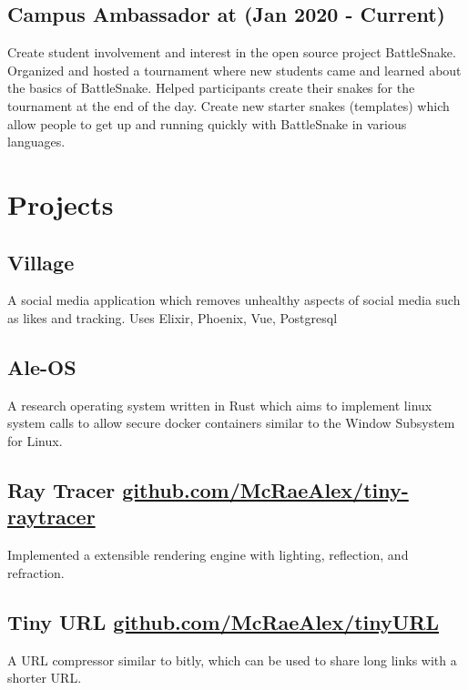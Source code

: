 \documentclass{article}
\newcommand{\hrefColored}[3]{\href{#2}{\color{#1}{#3}}}
\begin{document}
\subsection{Campus Ambassador at \hrefColored{blue}{https://github.com/McRaeAlex/AdventOfCode2018}{BattleSnake} (Jan 2020 - Current)}

Create student involvement and interest in the open source project BattleSnake.
Organized and hosted a tournament where new students came and learned about the 
basics of BattleSnake. Helped participants create their snakes for the tournament at the end of
the day. Create new starter snakes (templates) which allow people to get up and 
running quickly with BattleSnake in various languages.

\section{Projects}

\subsection{Village}

A social media application which removes unhealthy aspects of social media such as likes and tracking. Uses Elixir, Phoenix, Vue, Postgresql

\subsection{Ale-OS}

A research operating system written in Rust which aims to implement linux system calls to allow secure docker containers similar to the Window Subsystem for Linux.

\subsection{Ray Tracer \href{https://github.com/McRaeAlex/tiny-raytracer}{github.com/McRaeAlex/tiny-raytracer}}

Implemented a extensible rendering engine with lighting, reflection, and 
refraction.

\subsection{Tiny URL \href{https://github.com/McRaeAlex/tinyURL}{github.com/McRaeAlex/tinyURL}}

A URL compressor similar to bitly, which can be used to share long links with a 
shorter URL.
\end{document}
